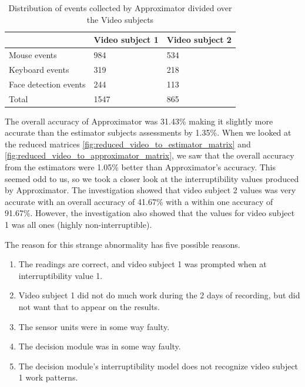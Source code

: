 \documentclass{sigchi}
\begin{document}
\begin{table}[h]
  \centering
  \begin{tabular}{@{}lll@{}}
    \toprule
     & Video subject 1 & Video subject 2\\ \midrule
    Mouse events       & 984    & 534    \\
    Keyboard events       & 319    & 218    \\
    Face detection events       & 244    & 113    \\ \midrule
    Total   & 1547 & 865\\ \bottomrule
  \end{tabular}
  \caption{Distribution of events collected by Approximator divided over the Video subjects}
  \label{tab:event_distribution}
\end{table}

The overall accuracy of Approximator was 31.43\% making it slightly more accurate than the estimator subjects assessments by 1.35\%.
When we looked at the reduced matrices \autoref{fig:reduced_video_to_estimator_matrix} and \autoref{fig:reduced_video_to_approximator_matrix}, we saw that the overall accuracy from the estimators were 1.05\% better than Approximator's accuracy.
This seemed odd to us, so we took a closer look at the interruptibility values produced by Approximator.
The investigation showed that video subject 2 values was very accurate with an overall accuracy of 41.67\% with a within one accuracy of 91.67\%.
However, the investigation also showed that the values for video subject 1 was all ones (highly non-interruptible).

The reason for this strange abnormality has five possible reasons.
\begin{enumerate}[noitemsep]
  \item The readings are correct, and video subject 1 was prompted when at interruptibility value 1.
  \item Video subject 1 did not do much work during the 2 days of recording, but did not want that to appear on the results.
  \item The sensor units were in some way faulty.
  \item The decision module was in some way faulty.
  \item The decision module's interruptibility model does not recognize video subject 1 work patterns.
\end{enumerate}
\end{document}
